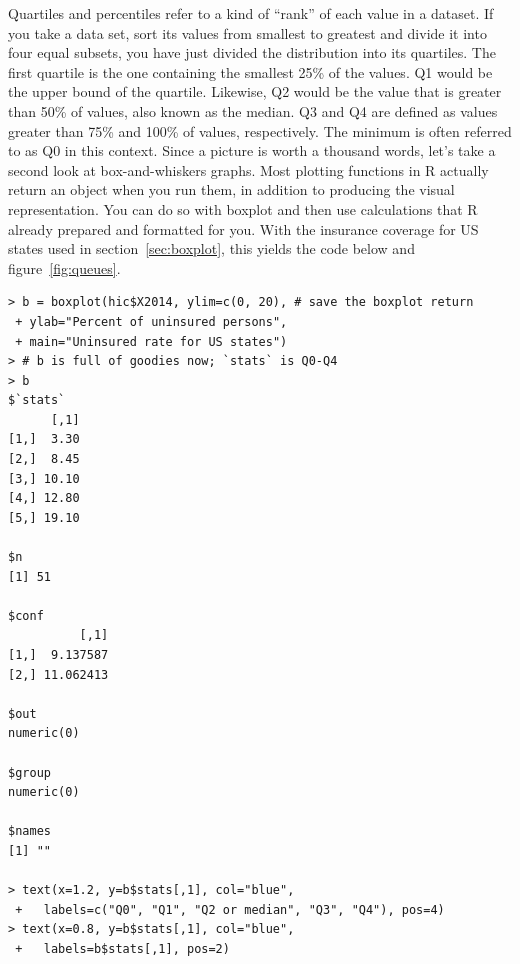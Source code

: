 \documentclass{report}
\newcommand{\code}[1]{\textsf{\ttfamily #1}}
\begin{document}
		Quartiles and percentiles refer to a kind of ``rank'' of each value in a dataset. If you take a data set, sort its values from smallest to greatest and divide it into four equal subsets, you have just divided the distribution into its quartiles. The first quartile is the one containing the smallest 25\% of the values. Q1 would be the upper bound of the quartile. Likewise, Q2 would be the value that is greater than 50\% of values, also known as the median. Q3 and Q4 are defined as values greater than 75\% and 100\% of values, respectively. The minimum is often referred to as Q0 in this context. Since a picture is worth a thousand words, let's take a second look at box-and-whiskers graphs. Most plotting functions in R actually return an object when you run them, in addition to producing the visual representation. You can do so with \code{boxplot} and then use calculations that R already prepared and formatted for you. With the insurance coverage for US states used in section~\ref{sec:boxplot}, this yields the code below and figure~\ref{fig:queues}.
		
		\begin{verbatim}
> b = boxplot(hic$X2014, ylim=c(0, 20), # save the boxplot return
 + ylab="Percent of uninsured persons", 
 + main="Uninsured rate for US states")
> # b is full of goodies now; `stats` is Q0-Q4
> b
$`stats`
      [,1]
[1,]  3.30
[2,]  8.45
[3,] 10.10
[4,] 12.80
[5,] 19.10

$n
[1] 51

$conf
          [,1]
[1,]  9.137587
[2,] 11.062413

$out
numeric(0)

$group
numeric(0)

$names
[1] ""

> text(x=1.2, y=b$stats[,1], col="blue",
 +   labels=c("Q0", "Q1", "Q2 or median", "Q3", "Q4"), pos=4)
> text(x=0.8, y=b$stats[,1], col="blue",
 +   labels=b$stats[,1], pos=2)
		\end{verbatim}
		
\end{document}
